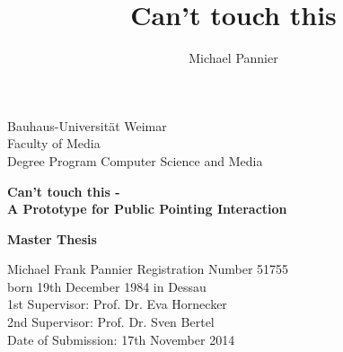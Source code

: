 
\begin{titlepage}
\large
\noindent
Bauhaus-Universität Weimar\\
Faculty of Media\\
Degree Program Computer Science and Media\\
\author{Michael Pannier}
\title{Can't touch this}
\vspace{20mm}
\begin{center}
    \huge{\bfseries{Can't touch this -\\
		A Prototype for Public Pointing Interaction}}
\end{center}
\vspace{15mm}
\begin{center}
    \huge{\bfseries{Master Thesis}}\\
\end{center}
\vspace{20mm}
Michael Frank Pannier
\hfill Registration Number 51755\\
born 19th December 1984 in Dessau\\
\newline
\newline
1st Supervisor: Prof. Dr. Eva Hornecker\\
2nd Supervisor: Prof. Dr. Sven Bertel\\
\vfil
\noindent
Date of Submission: 17th November 2014\\
\end{titlepage}
